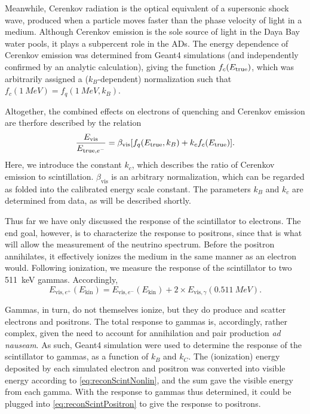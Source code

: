 \documentclass[../thesis.tex]{subfiles}
\begin{document}
Meanwhile, Cerenkov radiation is the optical equivalent of a supersonic shock wave, produced when a particle moves faster than the phase velocity of light in a medium. Although Cerenkov emission is the sole source of light in the Daya Bay water pools, it plays a subpercent role in the ADs. The energy dependence of Cerenkov emission was determined from Geant4 simulations (and independently confirmed by an analytic calculation), giving the function $f_c(E_\mathrm{true})$, which was arbitrarily assigned a ($k_B$-dependent) normalization such that $f_c(\SI{1}{MeV}) = f_q(\SI{1}{MeV}, k_B)$. 

Altogether, the combined effects on electrons of quenching and Cerenkov emission are therfore described by the relation
\begin{equation}
  \label{eq:reconScintNonlin}
  \frac{E_{\mathrm{vis}}}{E_{\mathrm{true},e^-}} = \beta_{\mathrm{vis}}[f_q(E_\mathrm{true}, k_B) + k_c f_c(E_\mathrm{true})].
\end{equation}
Here, we introduce the constant $k_c$, which describes the ratio of Cerenkov emission to scintillation. $\beta_{\mathrm{vis}}$ is an arbitrary normalization, which can be regarded as folded into the calibrated energy scale constant. The parameters $k_B$ and $k_c$ are determined from data, as will be described shortly.

Thus far we have only discussed the response of the scintillator to electrons. The end goal, however, is to characterize the response to positrons, since that is what will allow the measurement of the neutrino spectrum. Before the positron annihilates, it effectively ionizes the medium in the same manner as an electron would. Following ionization, we measure the response of the scintillator to two 511~keV gammas. Accordingly,
\begin{equation}
  \label{eq:reconScintPositron}
  E_{\mathrm{vis},e^+}(E_{\mathrm{kin}}) = E_{\mathrm{vis},e^-}(E_{\mathrm{kin}}) + 2 \times E_{\mathrm{vis},\gamma}(\SI{0.511}{MeV}).
\end{equation}

Gammas, in turn, do not themselves ionize, but they do produce and scatter electrons and positrons. The total response to gammas is, accordingly, rather complex, given the need to account for annihilation and pair production \emph{ad nauseam}. As such, Geant4 simulation were used to determine the response of the scintillator to gammas, as a function of $k_B$ and $k_C$. The (ionization) energy deposited by each simulated electron and positron was converted into visible energy according to \eqref{eq:reconScintNonlin}, and the sum gave the visible energy from each gamma. With the response to gammas thus determined, it could be plugged into \eqref{eq:reconScintPositron} to give the response to positrons.
\end{document}
